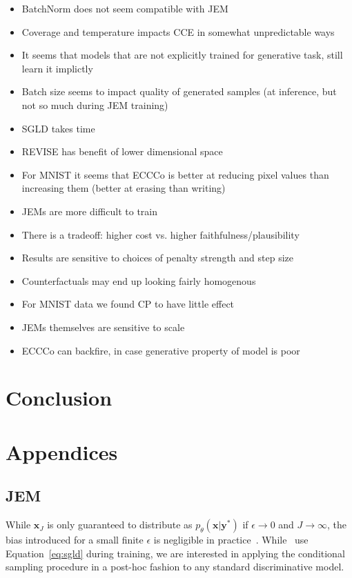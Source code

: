 \documentclass{article}
\begin{document}
\begin{itemize}
  \item BatchNorm does not seem compatible with JEM
  \item Coverage and temperature impacts CCE in somewhat unpredictable ways
  \item It seems that models that are not explicitly trained for generative task, still learn it implictly
  \item Batch size seems to impact quality of generated samples (at inference, but not so much during JEM training)
  \item SGLD takes time 
  \item REVISE has benefit of lower dimensional space
  \item For MNIST it seems that ECCCo is better at reducing pixel values than increasing them (better at erasing than writing)
  \item JEMs are more difficult to train
  \item There is a tradeoff: higher cost vs. higher faithfulness/plausibility
  \item Results are sensitive to choices of penalty strength and step size
  \item Counterfactuals may end up looking fairly homogenous
  \item For MNIST data we found CP to have little effect
  \item JEMs themselves are sensitive to scale
  \item ECCCo can backfire, in case generative property of model is poor
\end{itemize}

\section{Conclusion}

\medskip



\appendix
\section*{Appendices}
\renewcommand{\thesubsection}{\Alph{subsection}}

\subsection{JEM}\label{app-jem}

While $\mathbf{x}_J$ is only guaranteed to distribute as $p_{\theta}(\mathbf{x}|\mathbf{y}^*)$ if $\epsilon \rightarrow 0$ and $J \rightarrow \infty$, the bias introduced for a small finite $\epsilon$ is negligible in practice~\citep{murphy2023probabilistic,grathwohl2020your}. While~\citet{grathwohl2020your} use Equation~\ref{eq:sgld} during training, we are interested in applying the conditional sampling procedure in a post-hoc fashion to any standard discriminative model. 
\end{document}
